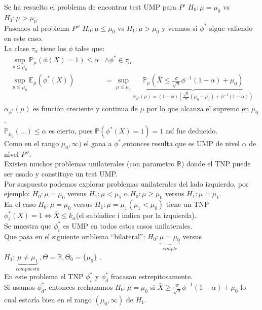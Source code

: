 \documentclass[10pt]{article}
\theoremstyle{plain}
\theoremstyle{definition}
\begin{document}
Se ha resuelto el problema de encontrar test UMP para $P'$ $H_{0}: \mu=\mu_{0}$ vs $H_{1}: \mu>\mu_{0}$.\\
Pasemos al problema $P''$ $H_{0}: \mu \le \mu_{0}$ vs $H_{1}: \mu>\mu_{0}$ y veamos si $\phi^*$ sigue valiendo en este caso.\\
La clase $\tau_{\alpha}$ tiene los $\phi$ tales que:
\begin{align*}
\sup_{\mu\le\mu_{0}}\mathbb{P}_{\mu}(\phi(X)=1) \le \alpha & \land \phi^* \in \tau_{\alpha}\\
\sup_{\mu\le \mu_{0}} \mathbb{E}_{\mu}(\phi^*(X)) &= \sup_{\mu\le \mu_{0}} \underbrace{\mathbb{P}_{\mu}(\bar{X}\le \frac{\sigma}{\sqrt{n}}\phi^{-1}(1-\alpha) + \mu_{0})}_{\alpha_{\phi^*}(\mu) = (1-\phi)\left(\frac{\sqrt{n}}{\sigma}(\mu_{0}-\mu_{1})+ \phi^{-1}(1-\alpha)\right)} 
\end{align*}
$\alpha_{\phi^*}(\mu)$ es función creciente y continua de $\mu$ por lo que alcanza el supremo en $\mu_{0}$.\\
$\mathbb{P}_{\mu_{0}}(\ldots) \le \alpha$ es cierto, pues $\mathbb{P}(\phi^*(X)=1)=1$ así fue deducido.\\
Como en el rango $\mu_{0},\infty)$ el gana a $\phi^*$,entonces resulta que es UMP de nivel $\alpha$ de nivel $P''$.\\

Existen muchos problemas unilaterales (con parametro $\mathbb{R}$) donde el TNP puede ser usado y constituye un test UMP.\\

Por suspuesto podemos explorar problemas unilaterales del lado izquierdo, por ejemplo: $H_{0}: \mu = \mu_{0}$ versus $H_{1}: \mu<\mu_{1}$ o $H_{0}: \mu \ge \mu_{0}$ versus $H_{1}: \mu=\mu_{1}$.\\

En el caso $H_{0}: \mu=\mu_{0}$ versus $H_{1}: \mu=\mu_{1} (\mu_{1}<\mu_{0})$ tiene un TNP $\phi_{i}^*(X)=1 \Leftrightarrow \bar{X}\le k_{\alpha}$(el subíndice i indica por la izquierda).\\

Se muestra que $\phi^*_{i}$ es UMP en todos estos casos unilaterales.\\

Que pasa en el siguiente oriblema ``bilateral'': $H_{0}: \underbrace{\mu=\mu_{0}}_{simple}$ versus $H_{1}: \underbrace{\mu\not = \mu_{1}}_{compuesta}, \Theta = \mathbb{R}, \Theta_{0}=\{\mu_{0}\}$ .\\

En este problema el TNP $\phi^*_{i}$ y $\phi^*_{d}$ fracasan estrepitosamente.\\
Si usamos $\phi_{d}^*$, entonces rechazamos $H_{0}:\mu=\mu_{0}$ si $\bar{X}\ge \frac{\sigma}{\sqrt{n}}\phi^{-1}(1-\alpha) + \mu_{0}$ lo cual estaría bien en el rango $(\mu_{0},\infty)$ de $H_{1}$.\\
\end{document}
